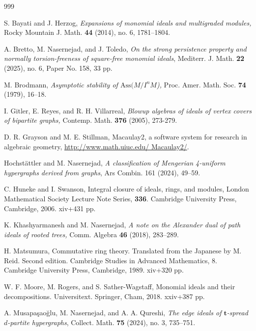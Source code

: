\documentclass[11pt]{amsart}
\begin{document}
\begin{thebibliography}{999}


 
  S.  Bayati and  J.  Herzog, \textit{Expansions of monomial ideals and multigraded modules,}  Rocky Mountain J. Math.
{\bf  44}  (2014), no. 6,  1781--1804.
 
  A.  Bretto,  M. Nasernejad,   and   J. Toledo, \textit{On the strong persistence property and normally torsion-freeness of square-free  monomial ideals}, Mediterr. J. Math. \textbf{22} (2025), no. 6, Paper No. 158, 33 pp. 

   M. Brodmann, {\it Asymptotic stability of $\mathrm{Ass}(M/I^{n}M$),}  Proc. Amer. Math. Soc. {\bf 74} (1979),  16--18.

     I. Gitler,  E. Reyes,  and R. H. Villarreal,  {\it Blowup algebras of ideals of vertex covers of bipartite graphs,} Contemp. Math.  {\bf 376} (2005), 273-279. 

     D. R. Grayson and  M. E. Stillman, Macaulay2, a software system for research in algebraic geometry,  
\url{http://www.math.uiuc.edu/ Macaulay2/}.

  Hochst\"attler and M.  Nasernejad, \textit{A classification of Mengerian 4-uniform hypergraphs derived from graphs}, Ars Combin. 161 (2024), 49--59. 

 C. Huneke and I. Swanson, {Integral closure of ideals, rings, and modules},  London Mathematical Society Lecture Note Series, \textbf{336}. 
 Cambridge University Press, Cambridge, 2006. xiv+431 pp.


  K. Khashyarmanesh and  M. Nasernejad, {\it A note on the Alexander dual of  path ideals of rooted  trees,} Comm. Algebra  {\bf 46} (2018),  283--289.

 
 H. Matsumura,  Commutative ring theory. Translated from the Japanese by M. Reid. Second edition. Cambridge Studies in Advanced Mathematics, 8. Cambridge University Press, Cambridge, 1989. {\rm xiv}+320 pp.  


 W. F. Moore, M. Rogers, and S. Sather-Wagstaff,  Monomial ideals and their decompositions. Universitext. Springer, Cham, 2018. xxiv+387 pp. 


 A.  Musapa\c{s}ao\u{g}lu, M. Nasernejad, and A. A. Qureshi, {\it The edge ideals of $\textbf{t}$-spread $d$-partite hypergraphs},    
Collect. Math. \textbf{75} (2024), no. 3, 735--751. 



\end{thebibliography}
\end{document}
